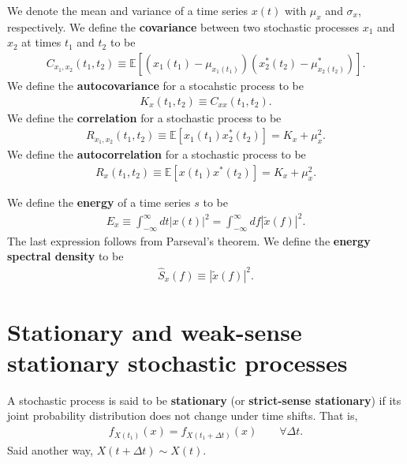 We denote the mean and variance of a time series $x(t)$ with $\mu_x$ and $\sigma_x$, respectively. 
We define the \textbf{covariance} between two stochastic processes $x_1$ and $x_2$ at times $t_1$ and $t_2$ to be 
\begin{align}
    C_{x_1,x_2}\left(t_1,t_2\right)
    \equiv
    \mathbb{E}\left[
        \left(x_1\left(t_1\right) - \mu_{x_1\left(t_1\right)}\right)
        \left(x^*_2\left(t_2\right) - \mu^*_{x_2\left(t_2\right)}\right)
    \right]
    .
\end{align}
We define the \textbf{autocovariance} for a stocahstic process to be 
\begin{align}
    K_{x}\left(t_1,t_2\right)
    \equiv
    C_{xx}\left(t_1,t_2\right)
    .
\end{align}
We define the \textbf{correlation} for a stochastic process to be 
\begin{align}
    R_{x_1,x_2}\left(t_1,t_2\right)
    \equiv
    \mathbb{E}\left[x_1\left(t_1\right)x_2^*\left(t_2\right)\right]
    =
    K_{x} + \mu_x^2
    .
\end{align}
We define the \textbf{autocorrelation} for a stochastic process to be
\begin{align}
    R_{x}\left(t_1,t_2\right)
    \equiv
    \mathbb{E}\left[x\left(t_1\right)x^*\left(t_2\right)\right]
    =
    K_{x} + \mu_x^2
    .
\end{align}

We define the \textbf{energy} of a time series $s$ to be 
\begin{align}
    E_{x}
    \equiv
    \int_{-\infty}^{\infty}dt \left|x\left(t\right)\right|^2
    =
    \int_{-\infty}^{\infty}df \left|\tilde{x}\left(f\right)\right|^2
    .
\end{align}
The last expression follows from Parseval's theorem.
We define the \textbf{energy spectral density} to be
\begin{align}
    \hat{S}_{x}\left(f\right)
    \equiv
    \left|\tilde{x}\left(f\right)\right|^2
    .
\end{align}

\section{Stationary and weak-sense stationary stochastic processes}

A stochastic process is said to be \textbf{stationary} (or \textbf{strict-sense stationary}) if its joint probability distribution does not change under time shifts. 
That is, 
\begin{align}
    f_{X\left(t_1\right)}\left(x\right)
    =
    f_{X\left(t_1+\Delta t\right)}\left(x\right)
    \qquad
    \forall \Delta t
    .
\end{align}
Said another way, $X\left(t+\Delta t\right) \sim X\left(t\right)$.

